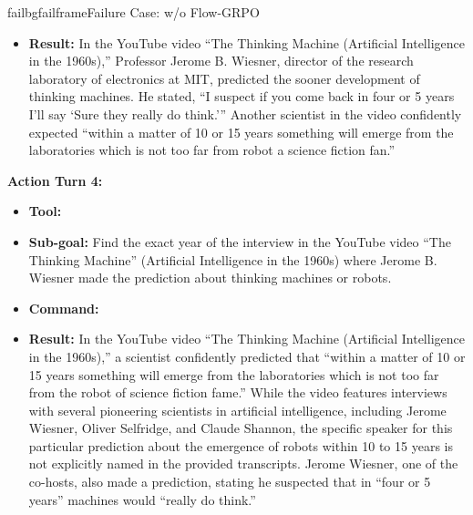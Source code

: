 \begin{small}
\begin{center}
\begin{casebox}{failbg}{failframe}{Failure Case: \model w/o Flow-GRPO}
\begin{itemize}[nosep, leftmargin=*]
        \item \textbf{Result:} In the YouTube video ``The Thinking Machine (Artificial Intelligence in the 1960s),'' Professor Jerome B. Wiesner, director of the research laboratory of electronics at MIT, predicted the sooner development of thinking machines. He stated, ``I suspect if you come back in four or 5 years I'll say `Sure they really do think.''' Another scientist in the video confidently expected ``within a matter of 10 or 15 years something will emerge from the laboratories which is not too far from robot a science fiction fan.''
    \end{itemize}

    \vspace{1em}

    \textbf{Action Turn 4:}
    \begin{itemize}[nosep, leftmargin=*]
        \item \textbf{Tool:} 
        \item \textbf{Sub-goal:} Find the exact year of the interview in the YouTube video ``The Thinking Machine'' (Artificial Intelligence in the 1960s) where Jerome B. Wiesner made the prediction about thinking machines or robots.
        \item \textbf{Command:}

        \item \textbf{Result:} In the YouTube video ``The Thinking Machine (Artificial Intelligence in the 1960s),'' a scientist confidently predicted that ``within a matter of 10 or 15 years something will emerge from the laboratories which is not too far from the robot of science fiction fame.'' While the video features interviews with several pioneering scientists in artificial intelligence, including Jerome Wiesner, Oliver Selfridge, and Claude Shannon, the specific speaker for this particular prediction about the emergence of robots within 10 to 15 years is not explicitly named in the provided transcripts. Jerome Wiesner, one of the co-hosts, also made a prediction, stating he suspected that in ``four or 5 years'' machines would ``really do think.''
    \end{itemize}


\end{casebox}
\end{center}
\end{small}

